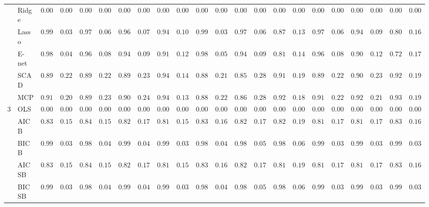 \begin{tabular}{p{0.2cm}p{1cm}|p{0.6cm}p{0.6cm}|p{0.6cm}p{0.6cm}p{0.6cm}p{0.6cm}p{0.6cm}p{0.6cm}|p{0.6cm}p{0.6cm}p{0.6cm}p{0.6cm}p{0.6cm}p{0.6cm}|p{0.6cm}p{0.6cm}p{0.6cm}p{0.6cm}p{0.6cm}p{0.6cm}}
 & Ridge  & $0.0000$ & $0.0000$ & $0.0000$ & $0.0000$ & $0.0000$ & $0.0000$ & $0.0000$ & $0.0000$ & $0.0000$ & $0.0000$ & $0.0000$ & $0.0000$ & $0.0000$ & $0.0000$ & $0.0000$ & $0.0000$ & $0.0000$ & $0.0000$ & $0.0000$ & $0.0000$ \\
 & Lasso  & $0.9933$ & $0.0328$ & $0.9783$ & $0.0611$ & $0.9633$ & $0.0771$ & $0.9400$ & $0.1073$ & $0.9917$ & $0.0365$ & $0.9733$ & $0.0658$ & $0.8700$ & $0.1373$ & $0.9783$ & $0.0697$ & $0.9433$ & $0.0983$ & $0.8000$ & $0.1658$ \\
 & E-net  & $0.9850$ & $0.0479$ & $0.9633$ & $0.0840$ & $0.9433$ & $0.0954$ & $0.9150$ & $0.1219$ & $0.9867$ & $0.0512$ & $0.9467$ & $0.0944$ & $0.8100$ & $0.1461$ & $0.9600$ & $0.0890$ & $0.9067$ & $0.1283$ & $0.7250$ & $0.1731$ \\
 & SCAD  & $0.8900$ & $0.2275$ & $0.8900$ & $0.2275$ & $0.8950$ & $0.2353$ & $0.9417$ & $0.1429$ & $0.8833$ & $0.2178$ & $0.8533$ & $0.2845$ & $0.9183$ & $0.1989$ & $0.8967$ & $0.2232$ & $0.9017$ & $0.2310$ & $0.9267$ & $0.1972$ \\
 & MCP  & $0.9117$ & $0.2002$ & $0.8983$ & $0.2308$ & $0.9000$ & $0.2439$ & $0.9450$ & $0.1320$ & $0.8867$ & $0.2271$ & $0.8650$ & $0.2810$ & $0.9217$ & $0.1827$ & $0.9133$ & $0.2216$ & $0.9233$ & $0.2189$ & $0.9333$ & $0.1925$ \\\hline
3 & OLS  & $0.0000$ & $0.0000$ & $0.0000$ & $0.0000$ & $0.0000$ & $0.0000$ & $0.0000$ & $0.0000$ & $0.0000$ & $0.0000$ & $0.0000$ & $0.0000$ & $0.0000$ & $0.0000$ & $0.0000$ & $0.0000$ & $0.0000$ & $0.0000$ & $0.0000$ & $0.0000$ \\
 & AIC B  & $0.8317$ & $0.1526$ & $0.8450$ & $0.1576$ & $0.8217$ & $0.1729$ & $0.8183$ & $0.1573$ & $0.8317$ & $0.1633$ & $0.8250$ & $0.1747$ & $0.8200$ & $0.1934$ & $0.8183$ & $0.1710$ & $0.8183$ & $0.1726$ & $0.8317$ & $0.1633$ \\
 & BIC B  & $0.9917$ & $0.0365$ & $0.9883$ & $0.0489$ & $0.9900$ & $0.0463$ & $0.9950$ & $0.0371$ & $0.9883$ & $0.0427$ & $0.9850$ & $0.0535$ & $0.9850$ & $0.0631$ & $0.9933$ & $0.0328$ & $0.9917$ & $0.0365$ & $0.9917$ & $0.0365$ \\
 & AIC SB  & $0.8317$ & $0.1526$ & $0.8450$ & $0.1576$ & $0.8217$ & $0.1729$ & $0.8183$ & $0.1573$ & $0.8317$ & $0.1633$ & $0.8250$ & $0.1747$ & $0.8183$ & $0.1926$ & $0.8183$ & $0.1710$ & $0.8183$ & $0.1726$ & $0.8317$ & $0.1633$ \\
 & BIC SB  & $0.9917$ & $0.0365$ & $0.9883$ & $0.0489$ & $0.9900$ & $0.0463$ & $0.9950$ & $0.0371$ & $0.9883$ & $0.0427$ & $0.9850$ & $0.0535$ & $0.9850$ & $0.0631$ & $0.9933$ & $0.0328$ & $0.9917$ & $0.0365$ & $0.9917$ & $0.0365$ \\

\end{tabular}
